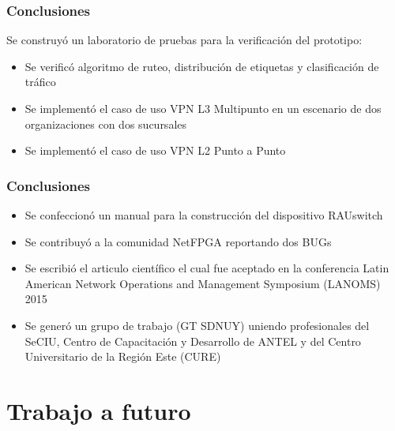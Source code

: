 \documentclass{beamer}
\begin{document}
\begin{frame}
\frametitle{Conclusiones} 

Se construy\'o un laboratorio de pruebas para la verificaci\'on del prototipo:

\begin{itemize}
\item Se verific\'o algoritmo de ruteo, distribuci\'on de etiquetas y clasificaci\'on de tr\'afico 

\item Se implement\'o el caso de uso VPN L3 Multipunto en un escenario de dos organizaciones con dos sucursales

\item Se implement\'o el caso de uso VPN L2 Punto a Punto 

\end{itemize}

\end{frame}

\begin{frame}
\frametitle{Conclusiones} 

\begin{itemize}
\item Se confeccion\'o un manual para la construcci\'on del dispositivo RAUswitch

\item Se contribuy\'o a la comunidad NetFPGA reportando dos BUGs

\item Se escribió el articulo cient\'ifico el cual fue aceptado en la conferencia Latin American Network Operations and Management Symposium (LANOMS) 2015

\item Se gener\'o un grupo de trabajo (GT SDNUY) uniendo profesionales del SeCIU, Centro de Capacitación y Desarrollo de ANTEL y del Centro Universitario de la Región Este (CURE) 

\end{itemize}

\end{frame}



\section{Trabajo a futuro} 
\end{document}
